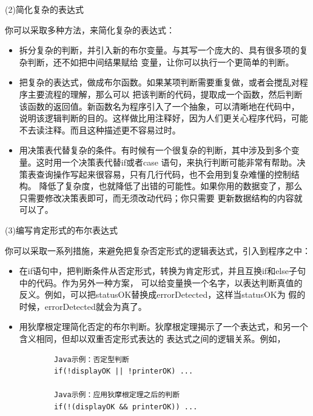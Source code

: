 \documentclass{article}
\begin{document}
\par
(2)简化复杂的表达式
\par
你可以采取多种方法，来简化复杂的表达式：
\begin{itemize}
    \item 拆分复杂的判断，并引入新的布尔变量。与其写一个庞大的、具有很多项的复杂判断，还不如把中间结果赋给
    变量，让你可以执行一个更简单的判断。
    \item 把复杂的表达式，做成布尔函数。如果某项判断需要重复做，或者会搅乱对程序主要流程的理解，那么可以
    把该判断的代码，提取成一个函数，然后判断该函数的返回值。新函数名为程序引入了一个抽象，可以清晰地在代码中，
    说明该逻辑判断的目的。这样做比用注释好，因为人们更关心程序代码，可能不去读注释。而且这种描述更不容易过时。
    \item 用决策表代替复杂的条件。有时候有一个很复杂的判断，其中涉及到多个变量。这时用一个决策表代替if或者case
    语句，来执行判断可能非常有帮助。决策表查询操作写起来很容易，只有几行代码，也不会用到复杂难懂的控制结构。
    降低了复杂度，也就降低了出错的可能性。如果你用的数据变了，那么只需要修改决策表即可，而无须改动代码；你只需要
    更新数据结构的内容就可以了。
\end{itemize}

\par
(3)编写肯定形式的布尔表达式
\par
你可以采取一系列措施，来避免把复杂否定形式的逻辑表达式，引入到程序之中：
\begin{itemize}
    \item 在if语句中，把判断条件从否定形式，转换为肯定形式，并且互换if和else子句中的代码。作为另外一种方案，
    可以给变量换一个名字，以表达判断真值的反义。例如，可以把statusOK替换成errorDetected，这样当statusOK为
    假的时候，errorDetected就会为真了。
    \item 用狄摩根定理简化否定的布尔判断。狄摩根定理揭示了一个表达式，和另一个含义相同，但却以双重否定形式表达的
    表达式之间的逻辑关系。例如，
    \begin{lstlisting}
        Java示例：否定型判断
        if(!displayOK || !printerOK) ...

        Java示例：应用狄摩根定理之后的判断
        if(!(displayOK && printerOK)) ...
    \end{lstlisting}
\end{itemize}
\end{document}
